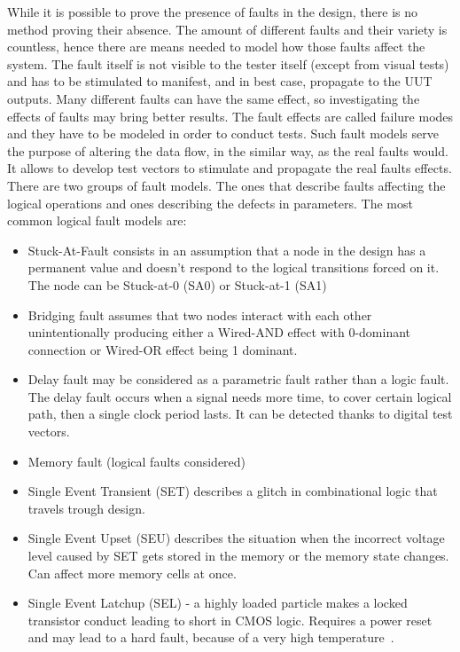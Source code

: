 While it is possible to prove the presence of faults in the design, there is no method proving their absence. The amount of different faults and their variety is countless, hence there are means needed to model how those faults affect the system. The fault itself is not visible to the tester itself (except from visual tests) and has to be stimulated to manifest, and in best case, propagate to the UUT outputs. Many different faults can have the same effect, so investigating the effects of faults may bring better results. The fault effects are called failure modes and they have to be modeled in order to conduct tests. Such fault models serve the purpose of altering the data flow, in the similar way, as the real faults would. It allows to develop test vectors to stimulate and propagate the real faults effects. There are two groups of fault models. The ones that describe faults affecting the logical operations and ones describing the defects in parameters. The most common logical fault models are:
\begin{itemize}
    \item Stuck-At-Fault consists in an assumption that a node in the design has a permanent value and doesn't respond to the logical transitions forced on it. The node can be Stuck-at-0 (SA0) or Stuck-at-1 (SA1)
    \item Bridging fault assumes that two nodes interact with each other unintentionally producing either a Wired-AND effect with 0-dominant connection or Wired-OR effect being 1 dominant.
    \item Delay fault may be considered as a parametric fault rather than a logic fault. The delay fault occurs when a signal needs more time, to cover certain logical path, then a single clock period lasts. It can be detected thanks to digital test vectors. 
    \item Memory fault (logical faults considered)
    \item Single Event Transient (SET) describes a glitch in combinational logic that travels trough design.
    \item Single Event Upset (SEU) describes the situation when the incorrect voltage level caused by SET gets stored in the memory or the memory state changes. Can affect more memory cells at once.
    \item Single Event Latchup (SEL) - a highly loaded particle makes a locked transistor conduct leading to short in CMOS logic. Requires a power reset and may lead to a hard fault, because of a very high temperature~\cite{report:altera}.
\end{itemize}
